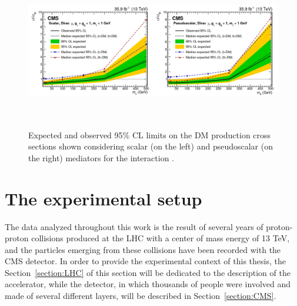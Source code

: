 \documentclass[a4paper, 10pt, openright]{report}
\begin{document}
\begin{figure}[htbp]
\begin{center}
\includegraphics[width=16cm, height=6.8cm]{figs/Combination2019.png}
\caption{Expected and observed 95\% \ac{CL} limits on the \ac{DM} production cross sections shown considering scalar (on the left) and pseudoscalar (on the right) mediators for the interaction \cite{PreviousSingleDoubleTopAllLep13CMS}.}
\label{figure:Combination2019}
\end{center}
\end{figure}



























\chapter{The experimental setup} \label{chapter:Device}

The data analyzed throughout this work is the result of several years of proton-proton collisions produced at the \ac{LHC} with a center of mass energy of 13 TeV, and the particles emerging from these collisions have been recorded with the \ac{CMS} detector. In order to provide the experimental context of this thesis, the Section~\ref{section:LHC} of this section will be dedicated to the description of the accelerator, while the detector, in which thousands of people were involved and made of several different layers, will be described in Section~\ref{section:CMS}.
\end{document}
